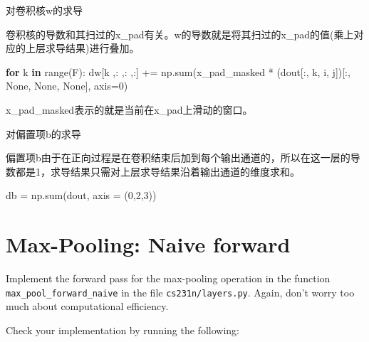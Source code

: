 \documentclass[11pt]{article}
\newenvironment{Shaded}{}{}
\newcommand{\KeywordTok}[1]{\textcolor[rgb]{0.00,0.44,0.13}{\textbf{{#1}}}}
\newcommand{\DecValTok}[1]{\textcolor[rgb]{0.25,0.63,0.44}{{#1}}}
\newcommand{\NormalTok}[1]{{#1}}
\newcommand{\VariableTok}[1]{\textcolor[rgb]{0.10,0.09,0.49}{{#1}}}
\newcommand{\ControlFlowTok}[1]{\textcolor[rgb]{0.00,0.44,0.13}{\textbf{{#1}}}}
\newcommand{\OperatorTok}[1]{\textcolor[rgb]{0.40,0.40,0.40}{{#1}}}
\newcommand{\BuiltInTok}[1]{{#1}}
\begin{document}
对卷积核w的求导

卷积核的导数和其扫过的x\_pad有关。w的导数就是将其扫过的x\_pad的值(乘上对应的上层求导结果)进行叠加。

\begin{Shaded}
\begin{Highlighting}[]
\ControlFlowTok{for}\NormalTok{ k }\KeywordTok{in} \BuiltInTok{range}\NormalTok{(F):}
\NormalTok{    dw[k ,: ,: ,:] }\OperatorTok{+=}\NormalTok{ np.}\BuiltInTok{sum}\NormalTok{(x_pad_masked }\OperatorTok{*}\NormalTok{ (dout[:, k, i, j])[:, }\VariableTok{None}\NormalTok{, }\VariableTok{None}\NormalTok{, }\VariableTok{None}\NormalTok{], axis}\OperatorTok{=}\DecValTok{0}\NormalTok{)}
\end{Highlighting}
\end{Shaded}

 x\_pad\_masked表示的就是当前在x\_pad上滑动的窗口。

对偏置项b的求导

偏置项b由于在正向过程是在卷积结束后加到每个输出通道的，所以在这一层的导数都是1，求导结果只需对上层求导结果沿着输出通道的维度求和。

\begin{Shaded}
\begin{Highlighting}[]
\NormalTok{db }\OperatorTok{=}\NormalTok{ np.}\BuiltInTok{sum}\NormalTok{(dout, axis }\OperatorTok{=}\NormalTok{ (}\DecValTok{0}\NormalTok{,}\DecValTok{2}\NormalTok{,}\DecValTok{3}\NormalTok{))}
\end{Highlighting}
\end{Shaded}

    \hypertarget{max-pooling-naive-forward}{%
\section{Max-Pooling: Naive forward}\label{max-pooling-naive-forward}}

Implement the forward pass for the max-pooling operation in the function
\texttt{max\_pool\_forward\_naive} in the file
\texttt{cs231n/layers.py}. Again, don't worry too much about
computational efficiency.

Check your implementation by running the following:
\end{document}

